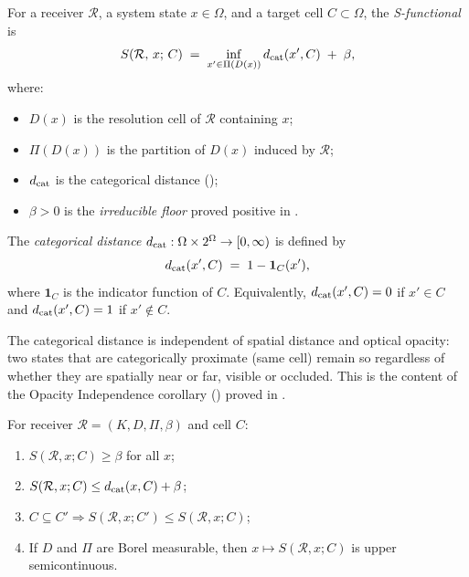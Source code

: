 \begin{definition}
\label{def:s-functional}
For a receiver $\mathcal{R}$, a system state $x \in \Omega$, and a target cell
$C \subset \Omega$, the \emph{S-functional} is
\[
  S(\mathcal{R},\, x;\, C)
  \;=\;
  \inf_{x' \in \Pi(D(x))} d_{\mathrm{cat}}(x', C) \;+\; \beta ,
\]
where:
\begin{itemize}
  \item $D(x)$ is the resolution cell of $\mathcal{R}$ containing $x$;
  \item $\Pi(D(x))$ is the partition of $D(x)$ induced by $\mathcal{R}$;
  \item $d_{\mathrm{cat}}$ is the categorical distance ();
  \item $\beta > 0$ is the \emph{irreducible floor} proved positive in
    .
\end{itemize}
\end{definition}

\begin{definition}
\label{def:categorical-distance}
The \emph{categorical distance} $d_{\mathrm{cat}} : \Omega \times 2^\Omega \to [0,\infty)$
is defined by
\[
  d_{\mathrm{cat}}(x', C) \;=\; 1 - \mathbf{1}_C(x') ,
\]
where $\mathbf{1}_C$ is the indicator function of $C$.  Equivalently,
$d_{\mathrm{cat}}(x', C) = 0$ if $x' \in C$ and $d_{\mathrm{cat}}(x', C) = 1$ if $x' \notin C$.
\end{definition}

\begin{remark}
The categorical distance is independent of spatial distance and optical
opacity: two states that are categorically proximate (same cell) remain so
regardless of whether they are spatially near or far, visible or occluded.
This is the content of the Opacity Independence corollary
() proved in .
\end{remark}

\begin{proposition}
\label{prop:basic-S}
For receiver $\mathcal{R} = (K, D, \Pi, \beta)$ and cell $C$:
\begin{enumerate}[(1)]
  \item $S(\mathcal{R}, x; C) \geq \beta$ for all $x$;
  \item $S(\mathcal{R}, x; C) \leq d_{\mathrm{cat}}(x, C) + \beta$;
  \item $C \subseteq C' \Rightarrow S(\mathcal{R}, x; C') \leq S(\mathcal{R}, x; C)$;
  \item If $D$ and $\Pi$ are Borel measurable, then $x \mapsto S(\mathcal{R}, x; C)$
    is upper semicontinuous.
\end{enumerate}
\end{proposition}

